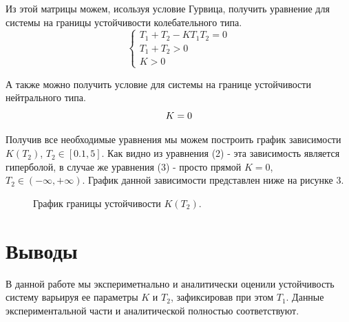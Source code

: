 \documentclass[a4paper, 11pt]{article}
\begin{document}
Из этой матрицы можем, исользуя условие Гурвица, получить уравнение для системы на границы устойчивости колебательного типа.
\begin{equation}
    \begin{cases}
        T_1 + T_2 - K T_1 T_2 = 0 \\
        T_1 + T_2 > 0 \\
        K > 0
    \end{cases}
\end{equation}

А также можно получить условие для системы на границе устойчивости нейтрального типа.
\begin{equation}
    K = 0 \\
\end{equation}

Получив все необходимые уравнения мы можем построить график зависимости $K(T_2)$, $T_2 \in [0.1, 5]$. Как видно из уравнения (2) - эта зависимость является гиперболой, в случае же уравнения (3) - просто прямой $K = 0$, $T_2 \in (-\infty, +\infty)$. График данной зависимости представлен ниже на рисунке 3.
\begin{figure}[h!]
    \centering
    \caption{График границы устойчивости $K(T_2)$.}
\end{figure}
\section*{Выводы}
В данной работе мы экспериметнально и аналитически оценили устойчивость систему варьируя ее параметры $K$ и $T_2$, зафиксировав при этом $T_1$. Данные экспериментальной части и аналитической полностью соответствуют.
\end{document}
